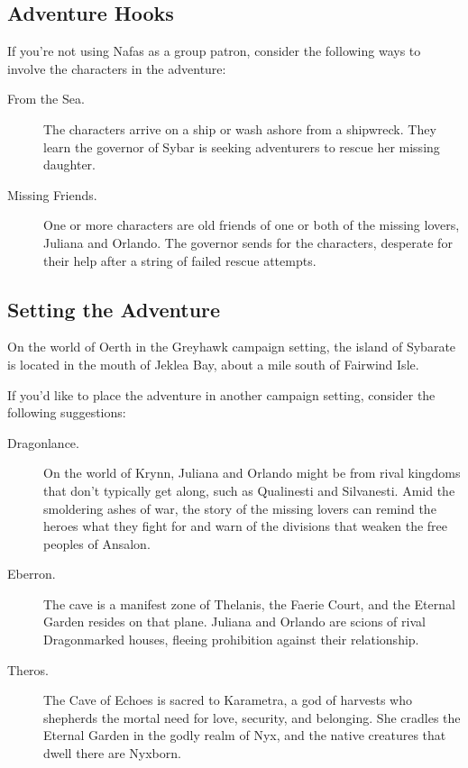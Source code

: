 \documentclass[10pt,a4paper,twoside,bg=print,twocolumn,openany,nodeprecatedcode]{dndbook}
\begin{document}
\subsection{Adventure Hooks}
If you're not using Nafas as a group patron, consider the following ways to involve the characters in the adventure:


\begin{description}
\item[From the Sea.]
The characters arrive on a ship or wash ashore from a shipwreck. They learn the governor of Sybar is seeking adventurers to rescue her missing daughter.
\item[Missing Friends.]
One or more characters are old friends of one or both of the missing lovers, Juliana and Orlando. The governor sends for the characters, desperate for their help after a string of failed rescue attempts.
\end{description}

\subsection{Setting the Adventure}
On the world of Oerth in the Greyhawk campaign setting, the island of Sybarate is located in the mouth of Jeklea Bay, about a mile south of Fairwind Isle.

If you'd like to place the adventure in another campaign setting, consider the following suggestions:


\begin{description}
\item[Dragonlance.]
On the world of Krynn, Juliana and Orlando might be from rival kingdoms that don't typically get along, such as Qualinesti and Silvanesti. Amid the smoldering ashes of war, the story of the missing lovers can remind the heroes what they fight for and warn of the divisions that weaken the free peoples of Ansalon.
\item[Eberron.]
The cave is a manifest zone of Thelanis, the Faerie Court, and the Eternal Garden resides on that plane. Juliana and Orlando are scions of rival Dragonmarked houses, fleeing prohibition against their relationship.
\item[Theros.]
The Cave of Echoes is sacred to Karametra, a god of harvests who shepherds the mortal need for love, security, and belonging. She cradles the Eternal Garden in the godly realm of Nyx, and the native creatures that dwell there are Nyxborn.
\end{description}
\end{document}
